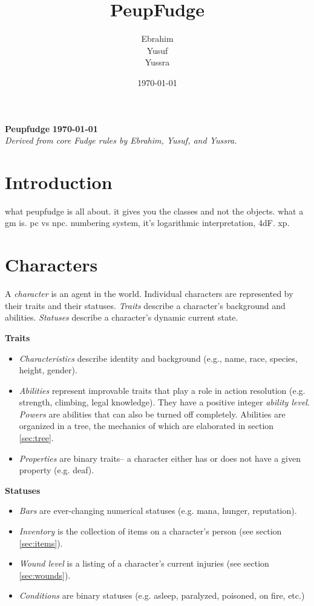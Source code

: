 \documentclass[12pt]{article}
\title{PeupFudge}
\author{Ebrahim \\ Yusuf \\ Yussra}
\date{\today}
\newcommand{\notes}[1]{{\color{Tan} #1}}
\begin{document}
\textbf{Peupfudge}
\hfill
\textbf{\today}\\
\textit{Derived from core Fudge rules by Ebrahim, Yusuf, and Yussra.}

\section{Introduction}
\notes{what peupfudge is all about.
it gives you the classes and not the objects.
what a gm is.
pc vs npc.
numbering system, it's logarithmic interpretation, 4dF.
xp.}

\section{Characters}
A \emph{character} is an agent in the world.
Individual characters are represented by their traits and their statuses.
\emph{Traits} describe a character's background and abilities.
\emph{Statuses} describe a character's dynamic current state.

\textbf{Traits}\vspace{-1em}
\begin{itemize}
\item \emph{Characteristics}
describe identity and background
(e.g., name, race, species, height, gender).
\item \emph{Abilities}
represent improvable traits that play a role in action resolution
(e.g. strength, climbing, legal knowledge).
They have a positive integer \emph{ability level}.
\emph{Powers} are abilities that can also be turned off completely.
Abilities are organized in a tree, the mechanics of which are elaborated in section \ref{sec:tree}.
\item \emph{Properties} are binary traits-- a character either has or does not have a given property (e.g. deaf).
\end{itemize}

\textbf{Statuses}\vspace{-1em}
\begin{itemize}
\item \emph{Bars} are ever-changing numerical statuses (e.g. mana, hunger, reputation).
\item \emph{Inventory} is the collection of items on a character's person (see section \ref{sec:items}).
\item \emph{Wound level} is a listing of a character's current injuries (see section \ref{sec:wounds}).
\item \emph{Conditions} are binary statuses (e.g. asleep, paralyzed, poisoned, on fire, etc.)
\end{itemize}
\end{document}

